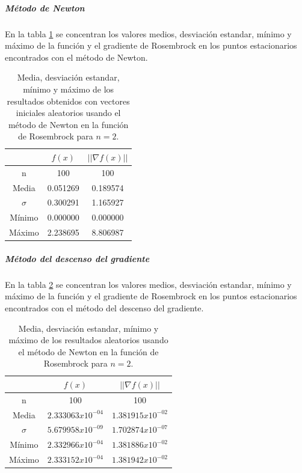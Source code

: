 \subparagraph{Método de Newton}

En la tabla \ref{table:rosembrock_2_random_newton} se concentran los valores medios, desviación estandar, mínimo y máximo de la función y el gradiente de Rosembrock en los puntos estacionarios encontrados con el método de Newton.

\begin{table}[H]
    \centering
    \begin{tabular}{ccc} \hline
                 & $f(x)$   & $||\nabla f(x)||$ \\ \hline
        n        & 100      & 100               \\
        Media    & 0.051269 & 0.189574          \\
        $\sigma$ & 0.300291 & 1.165927          \\
        Mínimo   & 0.000000 & 0.000000          \\
        Máximo   & 2.238695 & 8.806987          \\ \hline
    \end{tabular}
    \caption{Media, desviación estandar, mínimo y máximo de los resultados obtenidos con vectores iniciales aleatorios usando el método de Newton en la función de Rosembrock para $n=2$.}
    \label{table:rosembrock_2_random_newton}
\end{table}

\subparagraph{Método del descenso del gradiente}

En la tabla \ref{table:rosembrock_2_random_gradient} se concentran los valores medios, desviación estandar, mínimo y máximo de la función y el gradiente de Rosembrock en los puntos estacionarios encontrados con el método del descenso del gradiente.

\begin{table}[H]
    \centering
    \begin{tabular}{ccc} \hline
                 & $f(x)$              & $||\nabla f(x)||$   \\ \hline
        n        & 100                 & 100                 \\
        Media    & $2.333063x10^{-04}$ & $1.381915x10^{-02}$ \\
        $\sigma$ & $5.679958x10^{-09}$ & $1.702874x10^{-07}$ \\
        Mínimo   & $2.332966x10^{-04}$ & $1.381886x10^{-02}$ \\
        Máximo   & $2.333152x10^{-04}$ & $1.381942x10^{-02}$ \\ \hline
    \end{tabular}
    \caption{Media, desviación estandar, mínimo y máximo de los resultados aleatorios usando el método de Newton en la función de Rosembrock para $n=2$.}
    \label{table:rosembrock_2_random_gradient}
\end{table}


